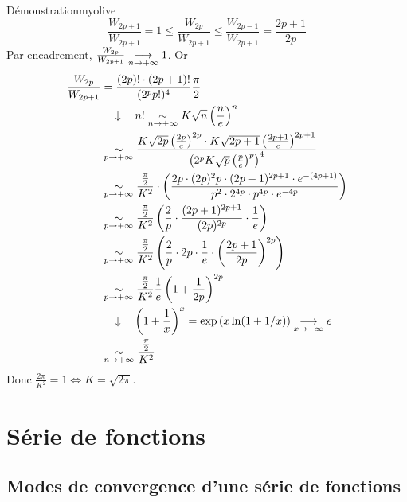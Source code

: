 \begin{demo}{Démonstration}{myolive}
            \[ \frac{W_{2p+1}}{W_{2p+1}} = 1 \leq \frac{W_{2p}}{W_{2p+1}} \leq \frac{W_{2p-1}}{W_{2p+1}} = \frac{2p+1}{2p} \] 
            Par encadrement, $\frac{W_{2p}}{W_{2p+1}} \underset{n \rightarrow +\infty}{\longrightarrow} 1$.
            Or 
            \begin{align*}
                \frac{W_{2p}}{W_{2p+1}}
                &= \frac{(2p)! \cdot (2p+1)!}{(2^p p!)^4} \frac{\pi}{2} \\
                & \quad \downarrow \quad n! \underset{n \rightarrow +\infty}{\sim} K \sqrt{n} \left( \frac{n}{e} \right)^n \\
                &\underset{p \rightarrow +\infty}{\sim} \frac{K \sqrt{2p} \left( \frac{2p}{e} \right)^{2p} \cdot K \sqrt{2p+1} \left( \frac{2p+1}{e} \right)^{2p+1}}{\left( 2^p K \sqrt{p} \left( \frac{p}{e} \right)^p \right)^4} \\
                &\underset{p \rightarrow +\infty}{\sim} \frac{\frac{\pi}{2}}{K^2} \cdot \left( \frac{2p \cdot (2p)^2p \cdot (2p+1)^{2p+1} \cdot e^{-(4p+1)}}{p^2 \cdot 2^{4p} \cdot p^{4p} \cdot e^{-4p}} \right) \\
                &\underset{p \rightarrow +\infty}{\sim} \frac{\frac{\pi}{2}}{K^2} \left( \frac{2}{p} \cdot \frac{(2p+1)^{2p+1}}{(2p)^{2p}} \cdot \frac{1}{e} \right) \\ 
                &\underset{p \rightarrow +\infty}{\sim} \frac{\frac{\pi}{2}}{K^2} \left( \frac{2}{p} \cdot 2p \cdot \frac{1}{e} \cdot \left( \frac{2p+1}{2p} \right)^{2p} \right) \\
                &\underset{p \rightarrow +\infty}{\sim} \frac{\frac{\pi}{2}}{K^2} \frac{1}{e} \left(1 + \frac{1}{2p}\right)^{2p} \\
                & \quad \downarrow \quad \left( 1 + \frac{1}{x} \right)^x = \exp\left( x \ln(1 + 1/x) \right) \underset{x \rightarrow +\infty}{\longrightarrow} e \\
                &\underset{n \rightarrow +\infty}{\sim} \frac{\frac{\pi}{2}}{K^2} 
            \end{align*}
            Donc $\frac{2\pi}{K^2} = 1 \iff K = \sqrt{2\pi}$. 
        \end{demo}

\section{Série de fonctions}

\subsection{Modes de convergence d’une série de fonctions}


